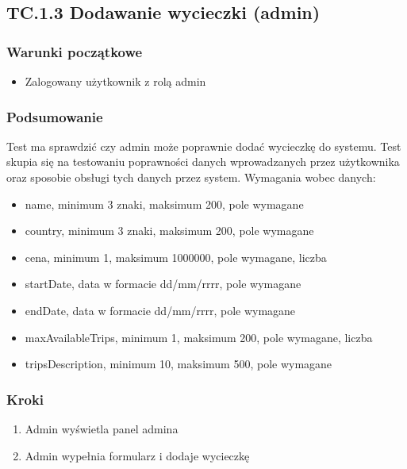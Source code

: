 \documentclass[a4paper,15pt]{article}
\begin{document}
\newpage
\begin{framed}
\subsection{TC.1.3 Dodawanie wycieczki (admin)}

\vspace{0.5cm}

\subsubsection{Warunki początkowe}
\begin{itemize}
\item Zalogowany użytkownik z rolą admin
\end{itemize}

\subsubsection{Podsumowanie}
Test ma sprawdzić czy admin może poprawnie dodać wycieczkę do systemu. Test skupia się na testowaniu poprawności danych wprowadzanych przez użytkownika oraz sposobie obsługi tych danych przez system.
Wymagania wobec danych:
\begin{itemize}
\item name, minimum 3 znaki, maksimum 200, pole wymagane
\item country, minimum 3 znaki, maksimum 200, pole wymagane
\item cena, minimum 1, maksimum 1000000, pole wymagane, liczba
\item startDate, data w formacie dd/mm/rrrr, pole wymagane
\item endDate, data w formacie dd/mm/rrrr, pole wymagane
\item maxAvailableTrips, minimum 1, maksimum 200, pole wymagane, liczba
\item tripsDescription, minimum 10, maksimum 500, pole wymagane
\end{itemize}

\subsubsection{Kroki}
\begin{enumerate}
\item Admin wyświetla panel admina
\item Admin wypełnia formularz i dodaje wycieczkę
\end{enumerate}


\end{framed}
\end{document}
